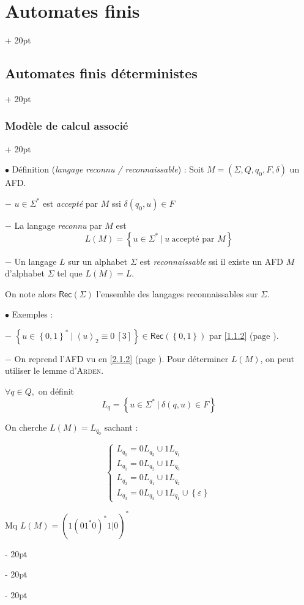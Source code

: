 \documentclass[a4paper, 12pt, twoside]{article}
\newcommand{\lr}[1]{\left( #1 \right)}
\newcommand{\set}[1]{\left\{ #1 \right\}}
\newcommand{\lrangle}[1]{\left\langle #1 \right\rangle}
\newcommand{\ind}[1][20pt]{\advance\leftskip + #1}
\newcommand{\deind}[1][20pt]{\advance\leftskip - #1}
\newenvironment{indt}[2][20pt]{#2 \par \ind[#1]}{\par \deind} %
\newcommand{\Rec}[1]{\mathsf{Rec}\!\lr{#1}}
\begin{document}
\begin{indt}{\section{Automates finis}}
\begin{indt}{\subsection{Automates finis déterministes}}
\begin{indt}{\subsubsection{Modèle de calcul associé}}
                \vspace{12pt}
                
                $\bullet$ Définition (\emph{langage reconnu / reconnaissable}) : Soit $M = (\Sigma, Q, q_0, F, \delta)$ un AFD.

                $-$ $u \in \Sigma ^*$ est \emph{accepté} par $M$ ssi $\delta(q_0, u) \in F$

                $-$ La langage \emph{reconnu} par $M$ est
                \[
                    L(M) = \set{u \in \Sigma^*\ |\ u\ \text{accepté par $M$}}
                \]

                $-$ Un langage $L$ sur un alphabet $\Sigma$ est \emph{reconnaissable} ssi il existe un AFD $M$ d'alphabet $\Sigma$ tel que $L(M) = L$.

                On note alors $\Rec \Sigma$ l'ensemble des langages reconnaissables sur $\Sigma$.

                \vspace{12pt}
                
                $\bullet$ Exemples :

                $-$ $\set{u \in \set{0, 1}^*\ |\ \lrangle u _2 \equiv 0\ [3]} \in \Rec{\set{0, 1}}$ par \ref{1.1.2} (page \pageref{1.1.2}).

                $-$ On reprend l'AFD vu en \ref{2.1.2} (page \pageref{2.1.2}).
                Pour déterminer $L(M)$, on peut utiliser le lemme d'\textsc{Arden}.

                $\forall q \in Q,$ on définit
                \[
                    L_q = \set{u \in \Sigma^*\ |\ \delta(q, u) \in F}
                \]

                On cherche $L(M) = L_{q_0}$ sachant :

                \[
                    \begin{cases}
                        L_{q_0} = 0L_{q_3} \cup 1L_{q_1}
                        \\
                        L_{q_1} = 0L_{q_2} \cup 1L_{q_3}
                        \\
                        L_{q_2} = 0L_{q_1} \cup 1L_{q_2}
                        \\
                        L_{q_3} = 0L_{q_3} \cup 1L_{q_1} \cup \set \varepsilon
                    \end{cases}
                \]

                 Mq $L(M) = (1(01^*0)^*1|0)^*$
            \end{indt}


\end{indt}
\end{indt}
\end{document}
